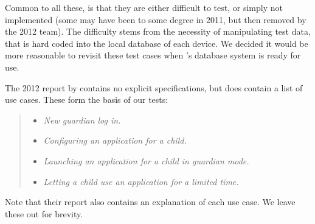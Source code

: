 Common to all these, is that they are either difficult to test, or simply not implemented (some may have been to some degree in 2011, but then removed by the 2012 team).
The difficulty stems from the necessity of manipulating test data, that is hard coded into the local database of each device. 
We decided it would be more reasonable to revisit these test cases when \giraf's database system is ready for use.

The 2012 report by \citet{launcher2012} contains no explicit specifications, but does contain a list of use cases. 
These form the basis of our tests:

\begin{quote}
\begin{itemize}
	\item \textit{New guardian log in.}
	\item \textit{Configuring an application for a child.}
	\item \textit{Launching an application for a child in guardian mode.}
	\item \textit{Letting a child use an application for a limited time.}
\end{itemize}
\end{quote}

Note that their report also contains an explanation of each use case. 
We leave these out for brevity.
